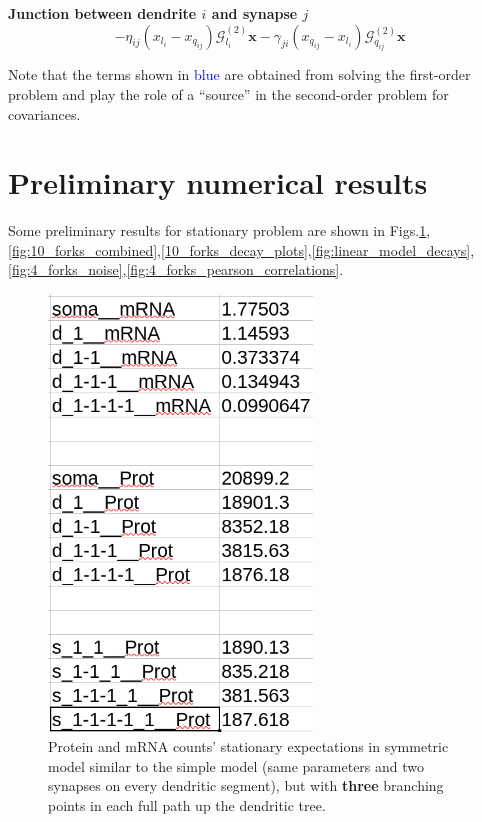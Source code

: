 \documentclass[a4paper, 11pt]{article}
\begin{document}
              {\bf Junction between dendrite $i$ and synapse $j$}
              \begin{equation*}
                -\eta_{ij}\left(x_{l_i}-x_{q_{ij}}\right)\boldsymbol{\mathcal G}^{(2)}_{l_i}\mathbf x - \gamma_{ji}\left(x_{q_{ij}}-x_{l_i}\right)\boldsymbol{\mathcal G}^{(2)}_{q_{ij}}\mathbf x
              \end{equation*}

              Note that the terms shown in \textcolor{blue}{blue} are obtained from solving the first-order problem and play the role of a ``source'' in the second-order problem for covariances.


\section{Preliminary numerical results}
Some preliminary results for stationary problem are shown in Figs.\ref{fig:3_branching_points_numbers},\ref{fig:10_forks_combined},\ref{10_forks_decay_plots},\ref{fig:linear_model_decays},\ref{fig:4_forks_noise},\ref{fig:4_forks_pearson_correlations}.
\begin{figure}
  \begin{center}
    \includegraphics[width=7cm]{img/3_branching_points_numbers.png}
  \end{center}  
  \caption{Protein and mRNA counts' stationary expectations in symmetric model similar to the simple model (same parameters and two synapses on every dendritic segment), but with {\bf three} branching points in each full path up the dendritic tree.}
  \label{fig:3_branching_points_numbers}
\end{figure}
\end{document}
